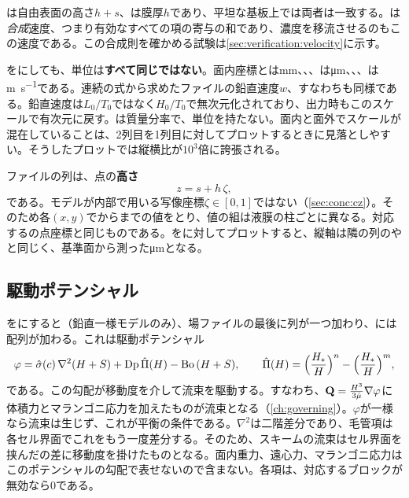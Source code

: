 は自由表面の高さ$h+s$、は膜厚$h$であり、平坦な基板上では両者は一致する。は\emph{合成}速度、つまり有効なすべての項の寄与の和であり、濃度を移流させるのもこの速度である。この合成則を確かめる試験は\cref{sec:verification:velocity}に示す。

をにしても、単位は\textbf{すべて同じではない}。面内座標とは\si{\milli\metre}、、、は\si{\micro\metre}、、、は\si{\metre\per\second}である。連続の式から求めたファイルの鉛直速度$w$、すなわちも同様である。鉛直速度は$L_0/T_0$ではなく$H_0/T_0$で無次元化されており、出力時もこのスケールで有次元に戻す。は質量分率で、単位を持たない。面内と面外でスケールが混在していることは、2列目を1列目に対してプロットするときに見落としやすい。そうしたプロットでは縦横比が$10^{3}$倍に誇張される。

ファイルの列は、点の\textbf{高さ}
\begin{equation*}
  z = s + h\,\zeta ,
\end{equation*}
である。モデルが内部で用いる写像座標$\zeta \in [0,1]$ではない（\cref{sec:conc:cz}）。そのため各$(x,y)$でからまでの値をとり、値の組は液膜の柱ごとに異なる。対応するの点座標と同じものである。をに対してプロットすると、縦軸は隣の列のやと同じく、基準面から測った\si{\micro\metre}となる。

\subsection{駆動ポテンシャル}
\label{sec:output:potential}

をにすると（鉛直一様モデルのみ）、場ファイルの最後に列が一つ加わり、には配列が加わる。これは駆動ポテンシャル
\begin{equation*}
  \varphi = \hat\sigma(c)\,\nabla^2(H+S) + \mathrm{Dp}\,\hat{\Pi}(H) - \mathrm{Bo}\,(H+S),
  \qquad \hat{\Pi}(H) = \Bigl(\frac{H_*}{H}\Bigr)^{n} - \Bigl(\frac{H_*}{H}\Bigr)^{m},
\end{equation*}
である。この勾配が移動度を介して流束を駆動する。すなわち、$\mathbf{Q} =
\tfrac{H^3}{3\hat\mu}\nabla\varphi$に体積力とマランゴニ応力を加えたものが流束となる（\cref{ch:governing}）。$\varphi$が一様なら流束は生じず、これが平衡の条件である。$\nabla^2$は二階差分であり、毛管項は各セル界面でこれをもう一度差分する。そのため、スキームの流束はセル界面を挟んだの差に移動度を掛けたものとなる。面内重力、遠心力、マランゴニ応力はこのポテンシャルの勾配で表せないので含まない。各項は、対応するブロックが無効なら0である。

